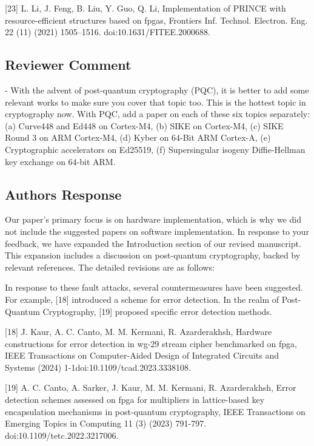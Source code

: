 [23] L. Li, J. Feng, B. Liu, Y. Guo, Q. Li, Implementation of PRINCE with resource-efficient structures based on fpgas, Frontiers Inf. Technol. Electron. Eng. 22 (11) (2021) 1505–1516. doi:10.1631/FITEE.2000688.

\color{black}



\subsection{Reviewer Comment}
- With the advent of post-quantum cryptography (PQC), it is better to add some relevant works to make sure you cover that topic too. This is the hottest topic in cryptography now. With PQC, add a paper on each of these six topics separately: (a) Curve448 and Ed448 on Cortex-M4, (b) SIKE on Cortex-M4, (c) SIKE Round 3 on ARM Cortex-M4, (d) Kyber on 64-Bit ARM Cortex-A, (e) Cryptographic accelerators on Ed25519, (f) Supersingular isogeny Diffie-Hellman key exchange on 64-bit ARM.

\subsection{Authors Response}


 Our paper's primary focus is on hardware implementation, which is why we did not include the suggested papers on software implementation. In response to your feedback, we have expanded the Introduction section of our revised manuscript. This expansion includes a discussion on post-quantum cryptography, backed by relevant references. The detailed revisions are as follows:

\color{blue}

In response to these fault attacks, several countermeasures have been suggested. For example, [18] introduced a scheme for error detection. In the realm of Post-Quantum Cryptography, [19] proposed specific error detection methods.

	[18] J. Kaur, A. C. Canto, M. M. Kermani, R. Azarderakhsh, Hardware constructions for error detection in wg-29 stream cipher benchmarked on fpga, IEEE Transactions on Computer-Aided Design of Integrated Circuits and Systems (2024) 1-1doi:10.1109/tcad.2023.3338108.

[19] A. C. Canto, A. Sarker, J. Kaur, M. M. Kermani, R. Azarderakhsh, Error detection schemes assessed on fpga for multipliers in lattice-based key encapsulation mechanisms in post-quantum cryptography, IEEE Transactions on Emerging Topics in Computing 11 (3) (2023) 791-797. doi:10.1109/tetc.2022.3217006.

